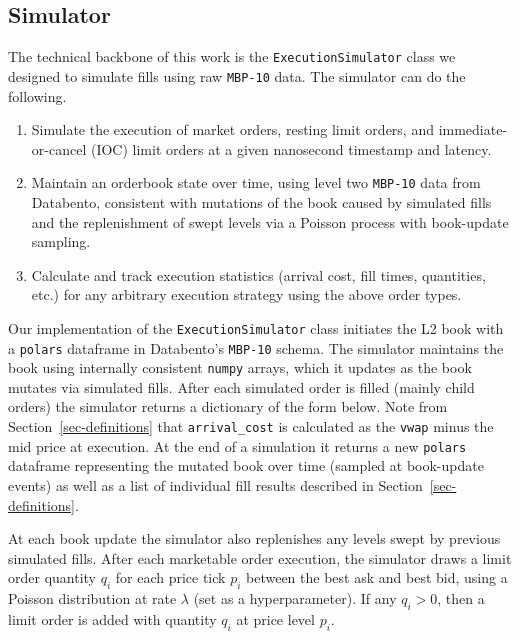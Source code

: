 \documentclass[
  letterpaper,
]{article}
\providecommand{\tightlist}{%
  \setlength{\itemsep}{0pt}\setlength{\parskip}{0pt}}
\begin{document}
\subsection{Simulator}\label{sec-sim}

The technical backbone of this work is the \texttt{ExecutionSimulator}
class we designed to simulate fills using raw \texttt{MBP-10} data. The
simulator can do the following.

\begin{enumerate}
\def\labelenumi{\arabic{enumi}.}
\tightlist
\item
  Simulate the execution of market orders, resting limit orders, and
  immediate-or-cancel (IOC) limit orders at a given nanosecond timestamp
  and latency.
\item
  Maintain an orderbook state over time, using level two \texttt{MBP-10}
  data from Databento, consistent with mutations of the book caused by
  simulated fills and the replenishment of swept levels via a Poisson
  process with book-update sampling.
\item
  Calculate and track execution statistics (arrival cost, fill times,
  quantities, etc.) for any arbitrary execution strategy using the above
  order types.
\end{enumerate}

Our implementation of the \texttt{ExecutionSimulator} class initiates
the L2 book with a \texttt{polars} dataframe in Databento's
\texttt{MBP-10} schema. The simulator maintains the book using
internally consistent \texttt{numpy} arrays, which it updates as the
book mutates via simulated fills. After each simulated order is filled
(mainly child orders) the simulator returns a dictionary of the form
below. Note from Section~\ref{sec-definitions} that
\texttt{arrival\_cost} is calculated as the \texttt{vwap} minus the mid
price at execution. At the end of a simulation it returns a new
\texttt{polars} dataframe representing the mutated book over time
(sampled at book-update events) as well as a list of individual fill
results described in Section~\ref{sec-definitions}.

At each book update the simulator also replenishes any levels swept by
previous simulated fills. After each marketable order execution, the
simulator draws a limit order quantity \(q_i\) for each price tick
\(p_i\) between the best ask and best bid, using a Poisson distribution
at rate \(\lambda\) (set as a hyperparameter). If any \(q_i>0\), then a
limit order is added with quantity \(q_i\) at price level \(p_i\).
\end{document}
